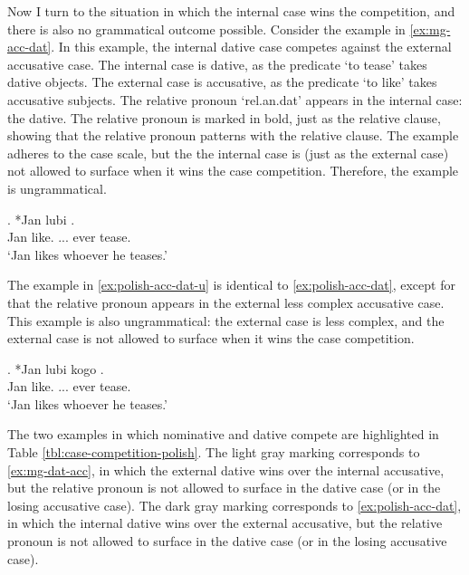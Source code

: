 Now I turn to the situation in which the internal case wins the competition, and there is also no grammatical outcome possible.
Consider the example in \ref{ex:mg-acc-dat}. In this example, the internal dative case competes against the external accusative case.
The internal case is dative, as the predicate  `to tease' takes dative objects.
The external case is accusative, as the predicate  `to like' takes accusative subjects.
The relative pronoun  `\ac{rel}.\ac{an}.\ac{dat}' appears in the internal case: the dative. The relative pronoun is marked in bold, just as the relative clause, showing that the relative pronoun patterns with the relative clause.
The example adheres to the case scale, but the the internal case is (just as the external case) not allowed to surface when it wins the case competition. Therefore, the example is ungrammatical.

\exg. *Jan lubi   .\\
Jan like. ... ever tease.\\
`Jan likes whoever he teases.' \label{ex:polish-acc-dat}

The example in \ref{ex:polish-acc-dat-u} is identical to \ref{ex:polish-acc-dat}, except for that the relative pronoun appears in the external less complex accusative case. This example is also ungrammatical: the external case is less complex, and the external case is not allowed to surface when it wins the case competition.

\exg. *Jan lubi kogo  .\\
Jan like. ... ever tease.\\
`Jan likes whoever he teases.' \label{ex:polish-acc-dat-u}

The two examples in which nominative and dative compete are highlighted in Table \ref{tbl:case-competition-polish}. The light gray marking corresponds to \ref{ex:mg-dat-acc}, in which the external dative wins over the internal accusative, but the relative pronoun is not allowed to surface in the dative case (or in the losing accusative case). The dark gray marking corresponds to \ref{ex:polish-acc-dat}, in which the internal dative wins over the external accusative, but the relative pronoun is not allowed to surface in the dative case (or in the losing accusative case).

